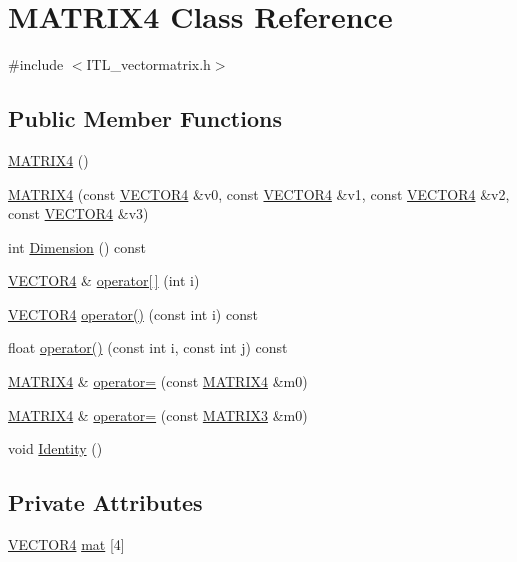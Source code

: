 \hypertarget{classMATRIX4}{
\section{MATRIX4 Class Reference}
\label{classMATRIX4}
}


{\ttfamily \#include $<$ITL\_\-vectormatrix.h$>$}

\subsection*{Public Member Functions}
\begin{DoxyCompactItemize}
\item 
\hyperlink{classMATRIX4_adbac71e9c60831aec2a35c43e1af6ca1}{MATRIX4} ()
\item 
\hyperlink{classMATRIX4_a5d47eec9650ec2cbb6ba3f347e63b3a9}{MATRIX4} (const \hyperlink{classVECTOR4}{VECTOR4} \&v0, const \hyperlink{classVECTOR4}{VECTOR4} \&v1, const \hyperlink{classVECTOR4}{VECTOR4} \&v2, const \hyperlink{classVECTOR4}{VECTOR4} \&v3)
\item 
int \hyperlink{classMATRIX4_af2d9ab8c4cfa8ccd705af3e0f2dd122d}{Dimension} () const 
\item 
\hyperlink{classVECTOR4}{VECTOR4} \& \hyperlink{classMATRIX4_ab266bb9fde86ff7085abb57bd7acbc25}{operator\mbox{[}$\,$\mbox{]}} (int i)
\item 
\hyperlink{classVECTOR4}{VECTOR4} \hyperlink{classMATRIX4_aab1a056c9199cf7c956ffa17a1607033}{operator()} (const int i) const 
\item 
float \hyperlink{classMATRIX4_af31bcf17f6a09d2c14ca7e84f73728f3}{operator()} (const int i, const int j) const 
\item 
\hyperlink{classMATRIX4}{MATRIX4} \& \hyperlink{classMATRIX4_a74b1f4b9862b324d0bf3841ac4dbbfbe}{operator=} (const \hyperlink{classMATRIX4}{MATRIX4} \&m0)
\item 
\hyperlink{classMATRIX4}{MATRIX4} \& \hyperlink{classMATRIX4_a0eab7ae1f433432b3e931c08c74d6410}{operator=} (const \hyperlink{classMATRIX3}{MATRIX3} \&m0)
\item 
void \hyperlink{classMATRIX4_a1140fdbe58cd646997db65e742d21739}{Identity} ()
\end{DoxyCompactItemize}
\subsection*{Private Attributes}
\begin{DoxyCompactItemize}
\item 
\hyperlink{classVECTOR4}{VECTOR4} \hyperlink{classMATRIX4_ac593e924265eb8846b77402f46ee82dd}{mat} \mbox{[}4\mbox{]}
\end{DoxyCompactItemize}


